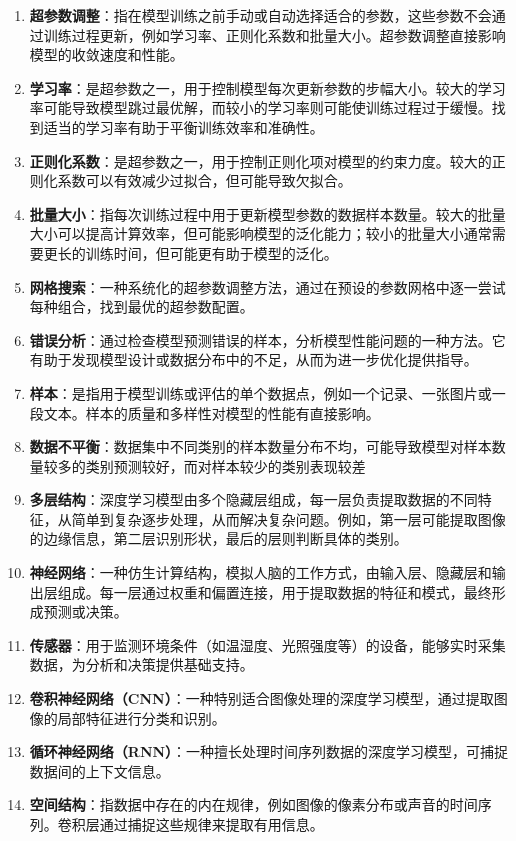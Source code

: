 \begin{enumerate}
\item \textbf{超参数调整}：指在模型训练之前手动或自动选择适合的参数，这些参数不会通过训练过程更新，例如学习率、正则化系数和批量大小。超参数调整直接影响模型的收敛速度和性能。
\item \textbf{学习率}：是超参数之一，用于控制模型每次更新参数的步幅大小。较大的学习率可能导致模型跳过最优解，而较小的学习率则可能使训练过程过于缓慢。找到适当的学习率有助于平衡训练效率和准确性。
\item \textbf{正则化系数}：是超参数之一，用于控制正则化项对模型的约束力度。较大的正则化系数可以有效减少过拟合，但可能导致欠拟合。
\item \textbf{批量大小}：指每次训练过程中用于更新模型参数的数据样本数量。较大的批量大小可以提高计算效率，但可能影响模型的泛化能力；较小的批量大小通常需要更长的训练时间，但可能更有助于模型的泛化。
\item \textbf{网格搜索}：一种系统化的超参数调整方法，通过在预设的参数网格中逐一尝试每种组合，找到最优的超参数配置。
\item\textbf{错误分析}：通过检查模型预测错误的样本，分析模型性能问题的一种方法。它有助于发现模型设计或数据分布中的不足，从而为进一步优化提供指导。
\item \textbf{样本}：是指用于模型训练或评估的单个数据点，例如一个记录、一张图片或一段文本。样本的质量和多样性对模型的性能有直接影响。
\item \textbf{数据不平衡}：数据集中不同类别的样本数量分布不均，可能导致模型对样本数量较多的类别预测较好，而对样本较少的类别表现较差
\item \textbf{多层结构}：深度学习模型由多个隐藏层组成，每一层负责提取数据的不同特征，从简单到复杂逐步处理，从而解决复杂问题。例如，第一层可能提取图像的边缘信息，第二层识别形状，最后的层则判断具体的类别。
\item \textbf{神经网络}：一种仿生计算结构，模拟人脑的工作方式，由输入层、隐藏层和输出层组成。每一层通过权重和偏置连接，用于提取数据的特征和模式，最终形成预测或决策。
\item \textbf{传感器}：用于监测环境条件（如温湿度、光照强度等）的设备，能够实时采集数据，为分析和决策提供基础支持。
\item \textbf{卷积神经网络（CNN）}：一种特别适合图像处理的深度学习模型，通过提取图像的局部特征进行分类和识别。
\item \textbf{循环神经网络（RNN）}：一种擅长处理时间序列数据的深度学习模型，可捕捉数据间的上下文信息。
\item \textbf{空间结构}：指数据中存在的内在规律，例如图像的像素分布或声音的时间序列。卷积层通过捕捉这些规律来提取有用信息。

\end{enumerate}
